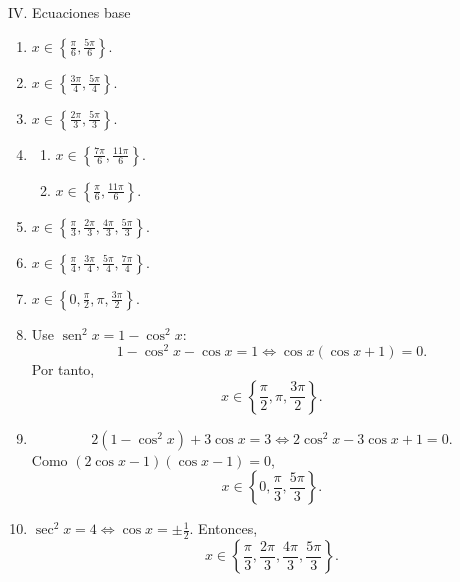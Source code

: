 \documentclass[letterpaper,12pt]{article}
\newcommand{\seno}{\operatorname{sen}}
\begin{document}
\begin{solbox}{IV. Ecuaciones base}
\begin{enumerate}[label=\color{azulFuerte}\textbf{\arabic*.},leftmargin=*,start=21]
    \item \(\displaystyle x\in\left\{\frac{\pi}{6},\frac{5\pi}{6}\right\}\).
    \item \(\displaystyle x\in\left\{\frac{3\pi}{4},\frac{5\pi}{4}\right\}\).
    \item \(\displaystyle x\in\left\{\frac{2\pi}{3},\frac{5\pi}{3}\right\}\).
    \item
    \begin{enumerate}[label=\alph*),leftmargin=*]
        \item \(\displaystyle x\in\left\{\frac{7\pi}{6},\frac{11\pi}{6}\right\}\).
        \item \(\displaystyle x\in\left\{\frac{\pi}{6},\frac{11\pi}{6}\right\}\).
    \end{enumerate}
    \item \(\displaystyle x\in\left\{\frac{\pi}{3},\frac{2\pi}{3},\frac{4\pi}{3},\frac{5\pi}{3}\right\}\).
    \item \(\displaystyle x\in\left\{\frac{\pi}{4},\frac{3\pi}{4},\frac{5\pi}{4},\frac{7\pi}{4}\right\}\).
    \item \(\displaystyle x\in\left\{0,\frac{\pi}{2},\pi,\frac{3\pi}{2}\right\}\).
    \item Use \(\seno^2x=1-\cos^2x\):
    \[
        1-\cos^2x-\cos x=1
        \iff \cos x(\cos x+1)=0.
    \]
    Por tanto,
    \[
        x\in\left\{\frac{\pi}{2},\pi,\frac{3\pi}{2}\right\}.
    \]
    \item
    \[
    2(1-\cos^2x)+3\cos x=3
    \iff 2\cos^2x-3\cos x+1=0.
    \]
    Como \((2\cos x-1)(\cos x-1)=0\),
    \[
        x\in\left\{0,\frac{\pi}{3},\frac{5\pi}{3}\right\}.
    \]
    \item \(\sec^2x=4\iff\cos x=\pm\frac12\). Entonces,
    \[
        x\in\left\{\frac{\pi}{3},\frac{2\pi}{3},\frac{4\pi}{3},\frac{5\pi}{3}\right\}.
    \]
\end{enumerate}
\end{solbox}
\end{document}

